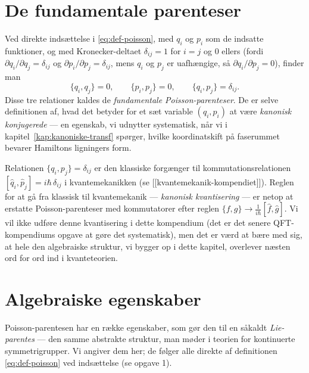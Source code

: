 \section{De fundamentale parenteser}

Ved direkte indsættelse i \eqref{eq:def-poisson}, med $q_i$ og $p_i$
som de indsatte funktioner, og med Kronecker-deltaet
$\delta_{ij}=1$ for $i=j$ og $0$ ellers (fordi $\partial q_i/\partial q_j=\delta_{ij}$
og $\partial p_i/\partial p_j=\delta_{ij}$, mens $q_i$ og $p_j$ er
uafhængige, så $\partial q_i/\partial p_j=0$), finder man
\begin{equation}
  \boxed{\{q_i,q_j\} = 0, \qquad \{p_i,p_j\} = 0, \qquad \{q_i,p_j\} = \delta_{ij}.}
  \label{eq:fundamentale-parenteser}
\end{equation}
Disse tre relationer kaldes de \emph{fundamentale
Poisson-parenteser}.
De er selve definitionen af, hvad det betyder for et sæt variable
$(q_i,p_i)$ at være \emph{kanonisk konjugerede} — en egenskab, vi
udnytter systematisk, når vi i kapitel~\ref{kap:kanoniske-transf}
spørger, hvilke koordinatskift på faserummet bevarer Hamiltons
ligningers form.

\begin{bemaerkning}
Relationen $\{q_i,p_j\}=\delta_{ij}$ er den klassiske forgænger til
kommutationsrelationen $[\hat q_i,\hat p_j]=i\hbar\,\delta_{ij}$ i
kvantemekanikken (se [[kvantemekanik-kompendiet]]). Reglen for at gå
fra klassisk til kvantemekanik — \emph{kanonisk kvantisering} — er
netop at erstatte Poisson-parenteser med kommutatorer efter reglen
$\{f,g\}\to \frac{1}{i\hbar}[\hat f,\hat g]$. Vi vil ikke udføre
denne kvantisering i dette kompendium (det er det senere QFT-
kompendiums opgave at gøre det systematisk), men det er værd at bære
med sig, at hele den algebraiske struktur, vi bygger op i dette
kapitel, overlever næsten ord for ord ind i kvanteteorien.
\end{bemaerkning}

\section{Algebraiske egenskaber}

Poisson-parentesen har en række egenskaber, som gør den til en såkaldt
\emph{Lie-parentes} — den samme abstrakte struktur, man møder i teorien
for kontinuerte symmetrigrupper. Vi angiver dem her; de følger alle
direkte af definitionen \eqref{eq:def-poisson} ved indsættelse (se
opgave 1).

